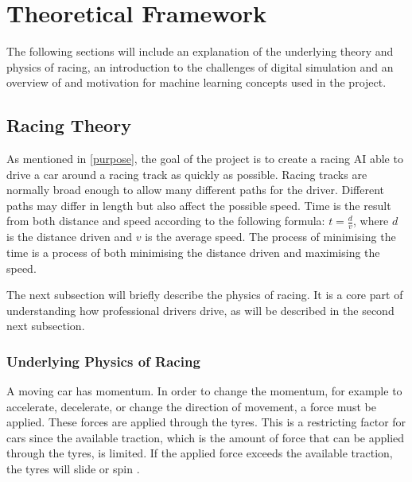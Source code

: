 \chapter{Theoretical Framework}


The following sections will include an explanation of the underlying theory and physics of racing, an introduction to the challenges of digital simulation and an overview of and motivation for machine learning concepts used in the project. 

\section{Racing Theory}
\label{racing_theory}

As mentioned in \ref{purpose}, the goal of the project is to create a racing AI able to drive a car around a racing track as quickly as possible. Racing tracks are normally broad enough to allow many different paths for the driver. Different paths may differ in length but also affect the possible speed. Time is the result from both distance and speed according to the following formula: \(t = \frac{d}{v}\), where $d$ is the distance driven and $v$ is the average speed. The process of minimising the time is a process of both minimising the distance driven and maximising the speed. 



The next subsection will briefly describe the physics of racing. It is a core part of understanding how professional drivers drive, as will be described in the second next subsection.

\subsection{Underlying Physics of Racing}
A moving car has momentum. In order to change the momentum, for example to accelerate, decelerate, or change the direction of movement, a force must be applied. These forces are applied through the tyres. This is a restricting factor for cars since the available traction, which is the amount of force that can be applied through the tyres, is limited. If the applied force exceeds the available traction, the tyres will slide or spin \cite{beckman}. 

